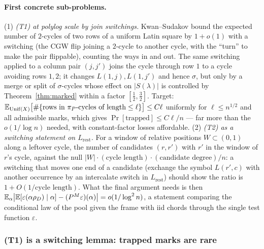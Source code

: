 \paragraph{First concrete sub-problems.}  (1) \emph{(T1) at polylog
scale by join switchings.}  Kwan--Sudakov \cite[Thm.~3 and Fact~10]{KS18}
bound the expected number of $2$-cycles of two rows of a uniform Latin
square by $1+o(1)$ with a switching (the CGW flip joining a $2$-cycle to
another cycle, with the ``turn'' to make the pair flippable), counting
the ways in and out.  The same switching applied to a column pair
$(j,j')$ joins the cycle through row $1$ to a cycle avoiding rows
$1,2$; it changes $L(1,j),L(1,j')$ and hence $\sigma$, but only by a
merge or split of $\sigma$-cycles whose effect on $|S(\lambda)|$ is
controlled by Theorem~\ref{thm:marked} within a factor $[\tfrac12,\tfrac32]$.
Target: $\mathbb{E}_{\mathrm{Unif}(X)}\bigl[\#\{\text{rows in }\pi_P\text{-cycles of length}\le\ell\}\bigr]\le C\ell$
uniformly for $\ell\le n^{1/2}$ and all admissible marks, which gives
$\Pr[\text{trapped}]\le C\ell/n$ --- far more than the $o(1/\log n)$
needed, with constant-factor losses affordable.  (2) \emph{(T2) as a
switching statement on $L_{\mathrm{rest}}$.}  For a window of
relative positions $W\subset(0,1)$ along a leftover cycle, the number
of candidates $(r,r')$ with $r'$ in the window of $r$'s cycle, against
the null $|W|\cdot(\text{cycle length})\cdot(\text{candidate degree})/n$:
a switching that moves one end of a candidate (exchange the symbol
$L(r',c)$ with another occurrence by an intercalate switch in
$L_{\mathrm{rest}}$) should show the ratio is $1+O(1/\text{cycle length})$.
What the final argument needs is then
$\mathbb{E}_\alpha\bigl|\mathbb{E}[\varepsilon(\alpha\rho_D)\mid\alpha]-(P^{M}\varepsilon)(\alpha)\bigr|=o(1/\log^2n)$,
a statement comparing the conditional law of the pool given the frame
with iid chords through the single test function $\varepsilon$.

\subsubsection{(T1) is a switching lemma: trapped marks are rare}
\label{sec:s13trapped}

